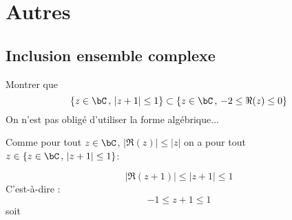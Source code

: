 \section{Autres}




\subsection{Inclusion ensemble complexe}

\begin{exercice}
Montrer que 
$$\{ z\in \bC\, , \, |z+1|\leq 1\} \subset \{ z \in \bC\, , \, -2\leq \Re(z)\leq0\}$$
\footnotesize{On n'est pas obligé d'utiliser la forme algébrique...}
\end{exercice}


\begin{correction}
 Comme pour tout $z\in \bC$, $|\Re(z)| \leq |z|$ on a pour tout $z\in \{ z\in \bC\, , \, |z+1|\leq 1\}$:
 
$$|\Re(z+1)| \leq |z+1|\leq 1$$
C'est-à-dire :
$$-1\leq z+1\leq 1$$
soit 
\begin{center}
\end{center}
\end{correction}




